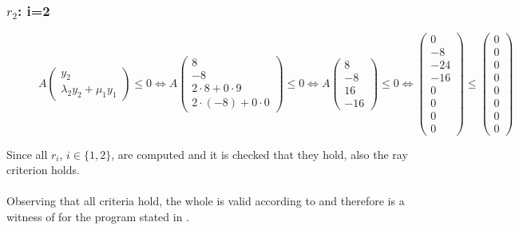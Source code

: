 	\subsubsection{$r_2$: i=2}
	\begin{figure}[H]
		\centering
		$A\begin{pmatrix} y_2 \\ \lambda_2y_2+\mu_1y_1 \end{pmatrix} \le 0 \Leftrightarrow A\begin{pmatrix} 8 \\ -8 \\ 2\cdot 8+0\cdot 9 \\ 2\cdot (-8)+0\cdot 0 \end{pmatrix} \le 0 \Leftrightarrow A\begin{pmatrix} 8 \\ -8 \\ 16 \\ -16 \end{pmatrix} \le 0 \Leftrightarrow \begin{pmatrix} 0 \\ -8 \\ -24 \\ -16 \\ 0 \\ 0 \\ 0 \\ 0 \end{pmatrix} \le \begin{pmatrix} 0 \\ 0 \\ 0 \\ 0 \\ 0 \\ 0 \\ 0 \\ 0 \end{pmatrix}$
	\end{figure}

	Since all $r_i$, $i \in \{1,2\}$, are computed and it is checked that they hold, also the ray criterion holds.
	\\
	\\
	Observing that all criteria hold, the whole \gna is valid according to  and therefore is a witness of \nonterm for the program stated in .
	
